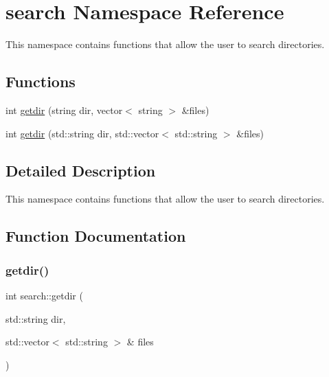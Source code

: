 \hypertarget{namespacesearch}{}\section{search Namespace Reference}
\label{namespacesearch}


This namespace contains functions that allow the user to search directories.  


\subsection*{Functions}
\begin{DoxyCompactItemize}
\item 
int \hyperlink{namespacesearch_a2f52a0545d237d7a566fcaa887bdc784}{getdir} (string dir, vector$<$ string $>$ \&files)
\item 
int \hyperlink{namespacesearch_aca625fab72dc71c5ebdabd84169040e1}{getdir} (std\+::string dir, std\+::vector$<$ std\+::string $>$ \&files)
\end{DoxyCompactItemize}


\subsection{Detailed Description}
This namespace contains functions that allow the user to search directories. 

\subsection{Function Documentation}
\mbox{\label{namespacesearch_aca625fab72dc71c5ebdabd84169040e1}} 
\subsubsection{\texorpdfstring{getdir()}{getdir()}\hspace{0.1cm}{\footnotesize\ttfamily [1/2]}}
{\footnotesize\ttfamily int search\+::getdir (\begin{DoxyParamCaption}\item[{std\+::string}]{dir,  }\item[{std\+::vector$<$ std\+::string $>$ \&}]{files }\end{DoxyParamCaption})}

\mbox{\label{namespacesearch_a2f52a0545d237d7a566fcaa887bdc784}} 
